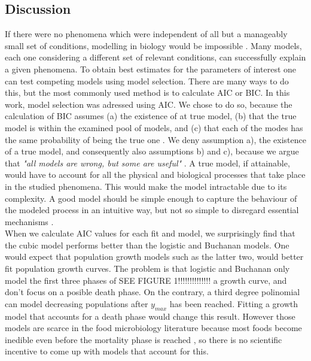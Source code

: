 \documentclass[titlepage,11pt]{article}
\begin{document}
\begin{linenumbers}
		\section{Discussion}
		If there were no phenomena which were independent of all but a manageably small set of conditions, modelling in biology would be impossible \cite{Wigner1995}. Many models, each one considering a different set of relevant conditions, can successfully explain a given phenomena.  To obtain best estimates for the parameters of interest one can test competing models using model selection. There are many ways to do this, but the most commonly used method is to calculate AIC or BIC. In this work, model selection was adressed using AIC. We chose to do so, because the calculation of BIC assumes (a) the existence of at true model, (b) that the true model is within the examined pool of models, and (c) that each of the modes has the same probability of being the true one \cite{Johnson2004}. We deny assumption a), the existence of a true model, and consequently also assumptions b) and c), because we argue that  \textit{"all models are wrong, but some are useful"} \cite{Box1976, Box1979}. A true model, if attainable, would have to account for all the physical and biological processes that take place in the studied phenomena. This would make the model intractable due to its complexity. A good model should be simple enough to capture the behaviour of the modeled process in an intuitive way, but not so simple to disregard essential mechanisms \cite{Chatfield1995}. \\
		When we calculate AIC values for each fit and model, we surprisingly find that the cubic model performs better than the logistic and Buchanan models. One would expect that population growth models such as the latter two, would better fit population growth curves. The problem is that logistic and Buchanan only model the first three phases of SEE FIGURE 1!!!!!!!!!!!!!! a growth curve, and don't focus on a posible death phase. On the contrary, a third degree polinomial can model decreasing populations after $ y_{max} $ has been reached. Fitting a growth model that accounts for a death phase \cite{Peleg2009, Baranyi1996} would change this result. However those models are scarce in the food microbiology literature because most foods become inedible even before the mortality phase is reached \cite{Micha2011}, so there is no scientific incentive to come up with models that account for this.\\

\end{linenumbers}
\end{document}
